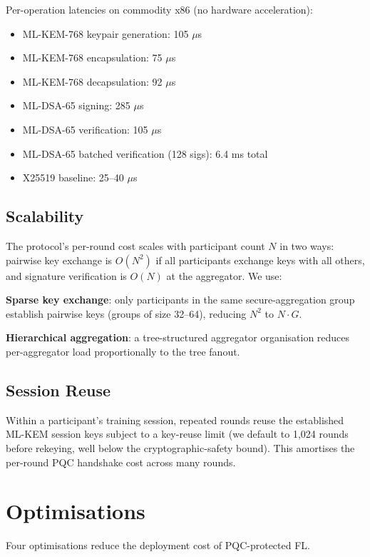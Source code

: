 \documentclass[sigconf,nonacm]{acmart}
\begin{document}
Per-operation latencies on commodity x86 (no hardware acceleration):

\begin{itemize}
  \item ML-KEM-768 keypair generation: 105 $\mu$s
  \item ML-KEM-768 encapsulation: 75 $\mu$s
  \item ML-KEM-768 decapsulation: 92 $\mu$s
  \item ML-DSA-65 signing: 285 $\mu$s
  \item ML-DSA-65 verification: 105 $\mu$s
  \item ML-DSA-65 batched verification (128 sigs): 6.4 ms total
  \item X25519 baseline: 25--40 $\mu$s
\end{itemize}

\subsection{Scalability}

The protocol's per-round cost scales with participant count $N$ in
two ways: pairwise key exchange is $O(N^2)$ if all participants
exchange keys with all others, and signature verification is
$O(N)$ at the aggregator. We use:

\textbf{Sparse key exchange}: only participants in the same secure-aggregation
group establish pairwise keys (groups of size 32--64),
reducing $N^2$ to $N \cdot G$.

\textbf{Hierarchical aggregation}: a tree-structured aggregator
organisation reduces per-aggregator load proportionally to the tree
fanout.

\subsection{Session Reuse}

Within a participant's training session, repeated rounds reuse the
established ML-KEM session keys subject to a key-reuse limit (we
default to 1{,}024 rounds before rekeying, well below
the cryptographic-safety bound). This amortises the per-round
PQC handshake cost across many rounds.

\section{Optimisations}

Four optimisations reduce the deployment cost of PQC-protected FL.
\end{document}
